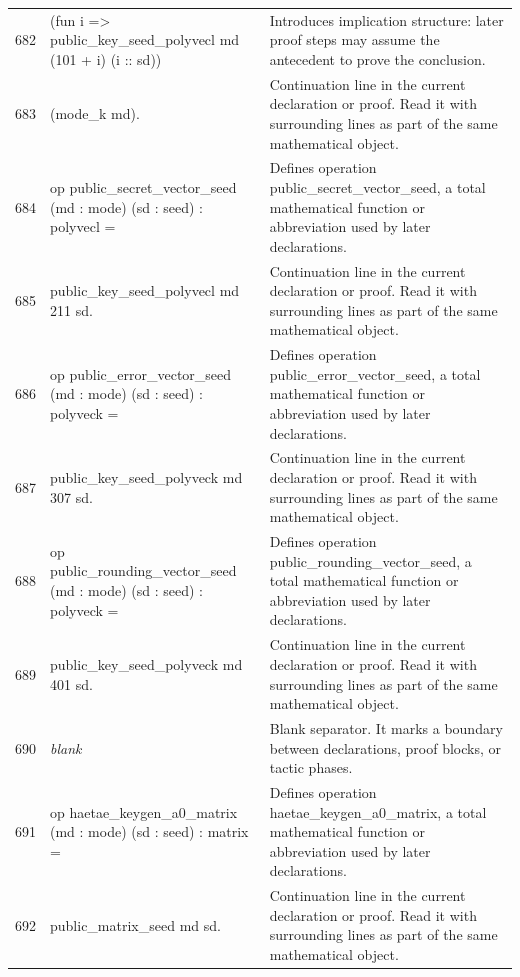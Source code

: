 \documentclass[10pt]{article}
\begin{document}
\begin{longtable}{r L{0.53\textwidth} L{0.37\textwidth}}
682 & {\ttfamily\scriptsize     (fun i => public\_key\_seed\_polyvecl md (101 + i) (i :: sd))} & Introduces implication structure: later proof steps may assume the antecedent to prove the conclusion. \\
683 & {\ttfamily\scriptsize     (mode\_k md).} & Continuation line in the current declaration or proof.  Read it with surrounding lines as part of the same mathematical object. \\
684 & {\ttfamily\scriptsize op public\_secret\_vector\_seed (md : mode) (sd : seed) : polyvecl =} & Defines operation public\_secret\_vector\_seed, a total mathematical function or abbreviation used by later declarations. \\
685 & {\ttfamily\scriptsize   public\_key\_seed\_polyvecl md 211 sd.} & Continuation line in the current declaration or proof.  Read it with surrounding lines as part of the same mathematical object. \\
686 & {\ttfamily\scriptsize op public\_error\_vector\_seed (md : mode) (sd : seed) : polyveck =} & Defines operation public\_error\_vector\_seed, a total mathematical function or abbreviation used by later declarations. \\
687 & {\ttfamily\scriptsize   public\_key\_seed\_polyveck md 307 sd.} & Continuation line in the current declaration or proof.  Read it with surrounding lines as part of the same mathematical object. \\
688 & {\ttfamily\scriptsize op public\_rounding\_vector\_seed (md : mode) (sd : seed) : polyveck =} & Defines operation public\_rounding\_vector\_seed, a total mathematical function or abbreviation used by later declarations. \\
689 & {\ttfamily\scriptsize   public\_key\_seed\_polyveck md 401 sd.} & Continuation line in the current declaration or proof.  Read it with surrounding lines as part of the same mathematical object. \\
690 & {\ttfamily\scriptsize \emph{blank}} & Blank separator.  It marks a boundary between declarations, proof blocks, or tactic phases. \\
691 & {\ttfamily\scriptsize op haetae\_keygen\_a0\_matrix (md : mode) (sd : seed) : matrix =} & Defines operation haetae\_keygen\_a0\_matrix, a total mathematical function or abbreviation used by later declarations. \\
692 & {\ttfamily\scriptsize   public\_matrix\_seed md sd.} & Continuation line in the current declaration or proof.  Read it with surrounding lines as part of the same mathematical object. \\

\end{longtable}
\end{document}
